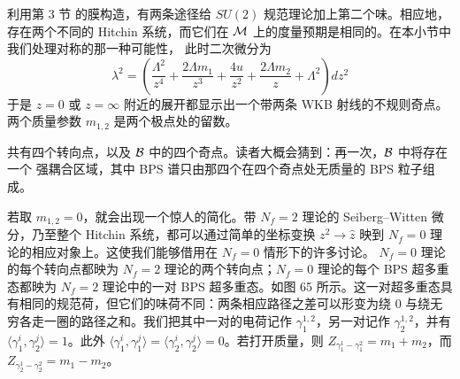 利用第 3 节%
的膜构造，有两条途径给 $SU(2)$ 规范理论加上第二个味。相应地，存在两个不同的 Hitchin
系统，而它们在 $\mathcal{M}$ 上的度量预期是相同的。在本小节中我们处理对称的那一种可能性，
此时二次微分为
\begin{equation}
\lambda^2 = \left( \frac{\Lambda^2}{z^4} + \frac{2 \Lambda m_1}{z^3} + \frac{4u}{z^2} +  \frac{2 \Lambda m_2}{z}+ \Lambda^2 \right) dz^2
\end{equation}
于是 $z = 0$ 或 $z = \infty$ 附近的展开都显示出一个带两条 WKB 射线的不规则奇点。
两个质量参数 $m_{1,2}$ 是两个极点处的留数。

共有四个转向点，以及 $\mathcal{B}$ 中的四个奇点。读者大概会猜到：再一次，$\mathcal{B}$ 中将存在一个
强耦合区域，其中 BPS 谱只由那四个在四个奇点处无质量的 BPS 粒子组成。

若取 $m_{1,2} = 0$，就会出现一个惊人的简化。带 $N_f = 2$ 理论的 Seiberg--Witten
微分，乃至整个 Hitchin 系统，都可以通过简单的坐标变换 $z^2 \to \hat z$ 映到
$N_f = 0$ 理论的相应对象上。这使我们能够借用在 $N_f = 0$ 情形下的许多讨论。
$N_f = 0$ 理论的每个转向点都映为 $N_f = 2$ 理论的两个转向点；$N_f=0$ 理论的每个
BPS 超多重态都映为 $N_f=2$ 理论中的一对 BPS 超多重态。如图 65%
所示。这一对超多重态具有相同的规范荷，但它们的味荷不同：两条相应路径之差可以形变为绕 $0$
与绕无穷各走一圈的路径之和。我们把其中一对的电荷记作 $\gamma_1^{1,2}$，另一对记作
$\gamma_2^{1,2}$，并有 $\langle \gamma_1^i, \gamma_2^j \rangle = 1$。此外
$\langle \gamma_1^i, \gamma_1^j\rangle =\langle
\gamma_2^i, \gamma_2^j\rangle =0$。若打开质量，则
$Z_{\gamma_1^1 - \gamma_1^2} = m_1+m_2$，而 $Z_{\gamma_2^1 -
\gamma_2^2} = m_1 - m_2$。


